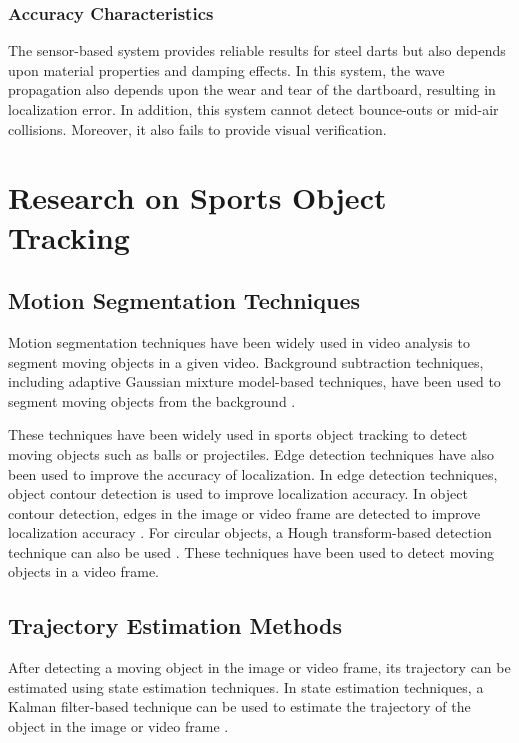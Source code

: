 \subsubsection{Accuracy Characteristics}

The sensor-based system provides reliable results for steel darts but also depends upon material properties and damping effects. In this system, the wave propagation also depends upon the wear and tear of the dartboard, resulting in localization error. In addition, this system cannot detect bounce-outs or mid-air collisions. Moreover, it also fails to provide visual verification.

\section{Research on Sports Object Tracking}

\subsection{Motion Segmentation Techniques}

Motion segmentation techniques have been widely used in video analysis to segment moving objects in a given video. Background subtraction techniques, including adaptive Gaussian mixture model-based techniques, have been used to segment moving objects from the background \cite{Zivkovic2004}.

These techniques have been widely used in sports object tracking to detect moving objects such as balls or projectiles. Edge detection techniques have also been used to improve the accuracy of localization. In edge detection techniques, object contour detection is used to improve localization accuracy. In object contour detection, edges in the image or video frame are detected to improve localization accuracy \cite{Canny1986}. For circular objects, a Hough transform-based detection technique can also be used \cite{Duda1972}. These techniques have been used to detect moving objects in a video frame.

\subsection{Trajectory Estimation Methods}

After detecting a moving object in the image or video frame, its trajectory can be estimated using state estimation techniques. In state estimation techniques, a Kalman filter-based technique can be used to estimate the trajectory of the object in the image or video frame \cite{Welch}.

